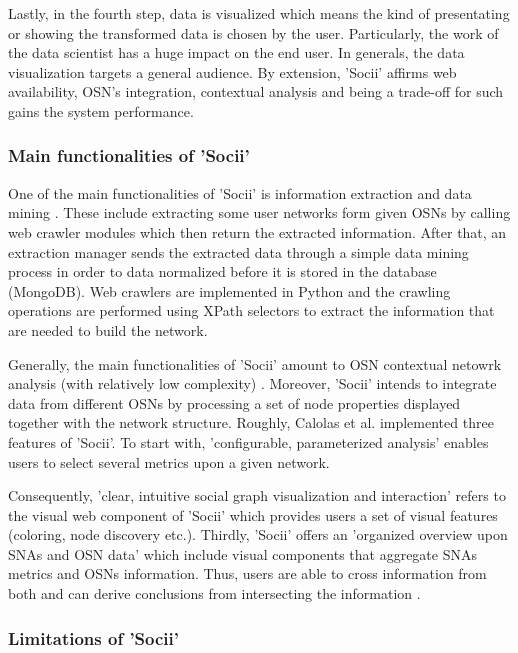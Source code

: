 Lastly, in the fourth step, data is visualized which means the kind of presentating or showing the transformed data is chosen by the user. Particularly, the work of the data scientist has a huge impact on the end user. In generals, the data visualization targets a general audience.  
By extension, 'Socii' affirms web availability, OSN's  integration, contextual analysis and being a trade-off for such gains the system performance.

\subsubsection{Main functionalities of 'Socii'}

One of the main functionalities of 'Socii' is information extraction and data mining \cite[p.223]{trends_nosql}. These include extracting some user networks form given OSNs by calling web crawler modules which then return the extracted information. After that, an extraction manager sends the extracted data through a simple data mining process in order to data normalized before it is stored in the database (MongoDB). Web crawlers are implemented in Python and the crawling operations are performed using XPath selectors to extract the information that are needed to build the network.

Generally, the main functionalities of 'Socii' amount to OSN contextual netowrk analysis (with relatively low complexity) \cite[p.227]{trends_nosql}. Moreover, 'Socii' intends to integrate data from different OSNs by processing a set of node properties displayed together with the network structure. Roughly, Calolas et al. implemented three features of 'Socii'. To start with, 'configurable, parameterized analysis' enables users to select several metrics upon a given network. 

Consequently, 'clear, intuitive social graph visualization and interaction' refers to the visual web component of 'Socii' which provides users a set of visual features (coloring, node discovery etc.). Thirdly, 'Socii' offers an 'organized overview upon SNAs and OSN data' which include visual components that aggregate SNAs metrics and OSNs information. Thus, users are able to cross information from both and can derive conclusions from intersecting the information \cite{trends_nosql}. 

\subsubsection{Limitations of 'Socii'}

